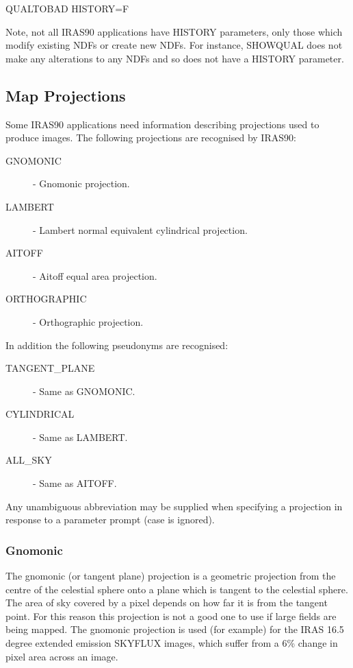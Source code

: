 \documentclass[11pt,nolof,noabs]{starlink}
\begin{document}
\small
\begin{terminalv}
QUALTOBAD HISTORY=F
\end{terminalv}
\normalsize
Note, not all {\small IRAS90} applications have {\small HISTORY}
parameters, only  those which modify existing {\small NDF}s or create
new {\small NDF}s. For  instance, {\small SHOWQUAL} does not make any
alterations to any {\small NDF}s and so does not have a {\small
HISTORY} parameter.

\subsection{Map Projections}
\label{SEC:PROJ}
Some {\small IRAS90} applications need information describing projections
used to produce images. The following projections are recognised
by {\small IRAS90}:
\begin{description}
\item [GNOMONIC]     - Gnomonic projection.
\item [LAMBERT]      - Lambert normal equivalent cylindrical projection.
\item [AITOFF]       - Aitoff equal area projection.
\item [ORTHOGRAPHIC] - Orthographic projection.
\end{description}

In addition the following pseudonyms are recognised:
\begin{description}

\item [TANGENT\_PLANE] - Same as GNOMONIC.
\item [CYLINDRICAL]   - Same as LAMBERT.
\item [ALL\_SKY]       - Same as AITOFF.
\end{description}

Any unambiguous abbreviation may be supplied when specifying a
projection in response to a parameter prompt (case is ignored).

\subsubsection{Gnomonic}
The gnomonic (or tangent plane) projection is a geometric
projection from the centre of the celestial sphere onto a plane
which is tangent to the celestial sphere. The area of sky
covered by a pixel depends on how far it is from the tangent
point. For this reason this projection is not a good one to use
if large fields are being mapped. The gnomonic projection is
used (for example) for the {\small IRAS} 16.5 degree extended emission
{\small SKYFLUX} images, which suffer from a 6\% change in pixel area
across an image.
\end{document}
